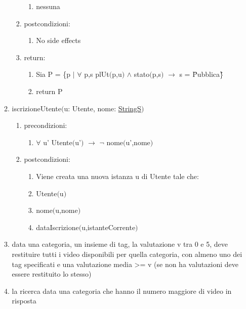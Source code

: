 \documentclass{article}
\begin{document}
\begin{enumerate}
\begin{enumerate}
\begin{enumerate}
\begin{enumerate}
                \item nessuna
            \end{enumerate}
            \item postcondizioni:
            \begin{enumerate}
                \item No side effects
            \end{enumerate}
            \item return:
            \begin{enumerate}
                \item Sia P = \{p $|$ $\forall$ p,s plUt$($p,u$)$ $\land$ stato$($p,s$)$ $\rightarrow$ s = \"Pubblica\"\}
                \item return P
            \end{enumerate}
        \end{enumerate}
        \item iscrizioneUtente$($u: Utente, nome: \hyperref[sec:TipoStringS]{StringS}$)$
        \begin{enumerate}
            \item precondizioni:
            \begin{enumerate}
                \item $\forall$ u' Utente$($u'$)$ $\rightarrow$ $\neg$ nome$($u',nome$)$
            \end{enumerate}
            \item postcondizioni:
            \begin{enumerate}
                \item Viene creata una nuova istanza u di Utente tale che:
                \item Utente$($u$)$
                \item nome$($u,nome$)$
                \item dataIscrizione$($u,istanteCorrente$)$
            \end{enumerate}
        \end{enumerate}
        \item data una categoria, un insieme di tag, la valutazione v tra 0 e 5, deve restituire tutti i video disponibili per quella categoria, con almeno uno dei tag specificati e una valutazione media >= v (se non ha valutazioni deve essere restituito lo stesso)
        \item la ricerca data una categoria che hanno il numero maggiore di video in risposta
        

\end{enumerate}
\end{enumerate}
\end{document}
